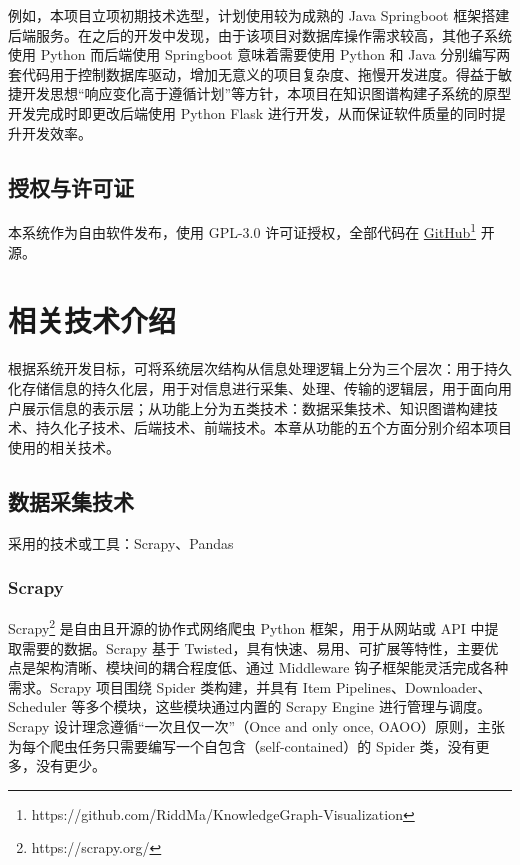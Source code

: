 \documentclass[a4paper,AutoFakeBold,oneside,12pt]{book}
\begin{document}
例如，本项目立项初期技术选型，计划使用较为成熟的 Java Springboot 框架搭建后端服务。在之后的开发中发现，由于该项目对数据库操作需求较高，其他子系统使用 Python 而后端使用 Springboot 意味着需要使用 Python 和 Java 分别编写两套代码用于控制数据库驱动，增加无意义的项目复杂度、拖慢开发进度。得益于敏捷开发思想``响应变化高于遵循计划''等方针，本项目在知识图谱构建子系统的原型开发完成时即更改后端使用 Python Flask 进行开发，从而保证软件质量的同时提升开发效率。

\section{授权与许可证}

本系统作为自由软件\cite{libre_software}发布，使用 GPL-3.0\cite{gpl_v3} 许可证授权，全部代码在 \href{https://github.com/RiddMa/KnowledgeGraph-Visualization}{GitHub}\footnote{https://github.com/RiddMa/KnowledgeGraph-Visualization} 开源。

\chapter{相关技术介绍}

根据系统开发目标，可将系统层次结构从信息处理逻辑上分为三个层次：用于持久化存储信息的持久化层，用于对信息进行采集、处理、传输的逻辑层，用于面向用户展示信息的表示层；从功能上分为五类技术：数据采集技术、知识图谱构建技术、持久化子技术、后端技术、前端技术。本章从功能的五个方面分别介绍本项目使用的相关技术。

\section{数据采集技术}

采用的技术或工具：Scrapy、Pandas

\subsection{Scrapy}

Scrapy\footnote{https://scrapy.org/} 是自由且开源的协作式网络爬虫 Python 框架，用于从网站或 API 中提取需要的数据。Scrapy 基于 Twisted，具有快速、易用、可扩展等特性，主要优点是架构清晰、模块间的耦合程度低、通过 Middleware 钩子框架能灵活完成各种需求。Scrapy 项目围绕 Spider 类构建，并具有 Item Pipelines、Downloader、Scheduler 等多个模块，这些模块通过内置的 Scrapy Engine 进行管理与调度。Scrapy 设计理念遵循``一次且仅一次''（Once and only once, OAOO）原则，主张为每个爬虫任务只需要编写一个自包含（self-contained）的 Spider 类，没有更多，没有更少。
\end{document}
